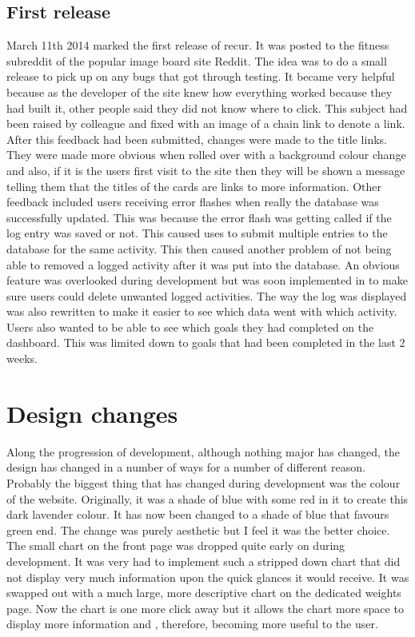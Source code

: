 \subsection{First release}
March 11th 2014 marked the first release of recur. It was posted to the fitness subreddit of the popular image board site Reddit\citep{reddit:2005}. The idea was to do a small release to pick up on any bugs that got through testing. It became very helpful because as the developer of the site knew how everything worked because they had built it, other people said they did not know where to click. This subject had been raised by colleague and fixed with an image of a chain link to denote a link. After this feedback had been submitted, changes were made to the title links. They were made more obvious when rolled over with a background colour change and also, if it is the users first visit to the site then they will be shown a message telling them that the titles of the cards are links to more information. Other feedback included users receiving error flashes when really the database was successfully updated. This was because the error flash was getting called if the log entry was saved or not. This caused uses to submit multiple entries to the database for the same activity. This then caused another problem of not being able to removed a logged activity after it was put into the database. An obvious feature was overlooked during development but was soon implemented in to make sure users could delete unwanted logged activities. The way the log was displayed was also rewritten to make it easier to see which data went with which activity. Users also wanted to be able to see which goals they had completed on the dashboard. This was limited down to goals that had been completed in the last 2 weeks.

\section{Design changes}
Along the progression of development, although nothing major has changed, the design has changed in a number of ways for a number of different reason. Probably the biggest thing that has changed during development was the colour of the website. Originally, it was a shade of blue with some red in it to create this dark lavender colour. It has now been changed to a shade of blue that favours green end. The change was purely aesthetic but I feel it was the better choice. The small chart on the front page was dropped quite early on during development. It was very had to implement such a stripped down chart that did not display very much information upon the quick glances it would receive. It was swapped out with a much large, more descriptive chart on the dedicated weights page. Now the chart is one more click away but it allows the chart more space to display more information and , therefore, becoming more useful to the user.

